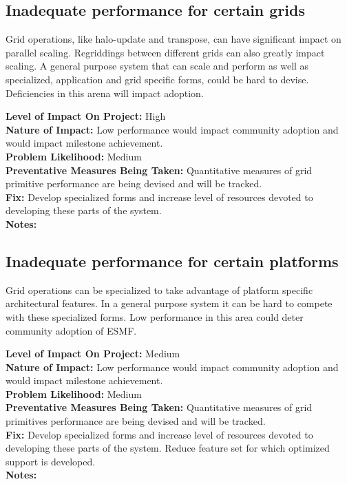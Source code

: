 \documentclass[english]{article}
\newcommand{\sreq}[1]{\subsection{\hspace{.2in}#1}}
\newenvironment
{reqlist}
{\begin{list} {} {} \rm \item[]}
{\end{list}}
\begin{document}
\sreq{Inadequate performance for certain grids}
Grid operations, like halo-update and transpose, can have significant impact on parallel scaling.
Regriddings between different grids can also greatly impact scaling.
A general purpose system that can scale and perform as well as specialized, application and
grid specific forms, could be hard to devise. Deficiencies in this arena will
impact adoption.
\begin{reqlist} 
{\bf Level of Impact On Project:} High \\ 
{\bf Nature of Impact:} Low performance would impact community adoption and
would impact milestone achievement.\\
{\bf Problem Likelihood:} Medium \\
{\bf Preventative Measures Being Taken:} Quantitative measures of grid primitive
performance are being devised and will be tracked.\\
{\bf Fix:} Develop specialized forms and increase level of resources devoted
to developing these parts of the system.\\
{\bf Notes:} 
\end{reqlist}

\sreq{Inadequate performance for certain platforms}
Grid operations can be specialized to take advantage of platform specific
architectural features. In a general purpose system it can be hard to compete with these
specialized forms. Low performance in this area could deter community adoption of ESMF.
\begin{reqlist}
{\bf Level of Impact On Project:} Medium \\
{\bf Nature of Impact:} Low performance would impact community adoption and
would impact milestone achievement.\\
{\bf Problem Likelihood:} Medium \\
{\bf Preventative Measures Being Taken:} Quantitative measures of grid primitives
performance are being devised and will be tracked.\\
{\bf Fix:} Develop specialized forms and increase level of resources devoted
to developing these parts of the system. Reduce feature set for which
optimized support is developed.
\\
{\bf Notes:} 
\end{reqlist}
\end{document}
